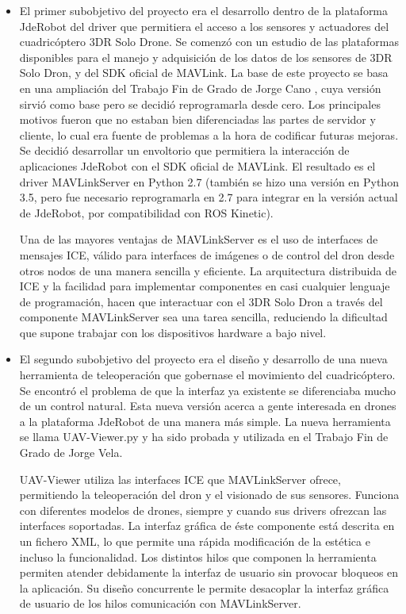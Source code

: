 \begin{itemize}
\item El primer subobjetivo del proyecto era el desarrollo dentro de la plataforma JdeRobot del driver que permitiera el acceso a los sensores y actuadores del cuadricóptero 3DR Solo Drone. Se comenzó con un estudio de las plataformas disponibles para el manejo y adquisición de los datos de los sensores de 3DR Solo Dron, y del SDK oficial de MAVLink. La base de este proyecto se basa en una ampliación del Trabajo Fin de Grado de Jorge Cano \cite{jorgeCano}, cuya versión sirvió como base pero se decidió reprogramarla desde cero. Los principales motivos fueron que no estaban bien diferenciadas las partes de servidor y cliente, lo cual era fuente de problemas a la hora de codificar futuras mejoras. Se decidió desarrollar un envoltorio que permitiera la interacción de aplicaciones JdeRobot con el SDK oficial de MAVLink. El resultado es el driver MAVLinkServer en Python 2.7 (también se hizo una versión en Python 3.5, pero fue necesario reprogramarla en 2.7 para integrar en la versión actual de JdeRobot, por compatibilidad con ROS Kinetic). 

Una de las mayores ventajas de MAVLinkServer es el uso de interfaces de mensajes ICE, válido para interfaces de imágenes o de control del dron desde otros nodos de una manera sencilla y eficiente. La arquitectura distribuida de ICE y la facilidad para implementar componentes en casi cualquier lenguaje de programación, hacen que interactuar con el 3DR Solo Dron a través del componente MAVLinkServer sea una tarea sencilla, reduciendo la dificultad que supone trabajar con los dispositivos hardware a bajo nivel.

\item El segundo subobjetivo del proyecto era el diseño y desarrollo de una nueva herramienta de teleoperación que gobernase el movimiento del cuadricóptero. Se encontró el problema de que la interfaz ya existente se diferenciaba mucho de un control natural. Esta nueva versión acerca a gente interesada en drones a la plataforma JdeRobot de una manera más simple. La nueva herramienta se llama UAV-Viewer.py y ha sido probada y utilizada en el Trabajo Fin de Grado de Jorge Vela\cite{jorgeVela}.

UAV-Viewer utiliza las interfaces ICE que MAVLinkServer ofrece, permitiendo la teleoperación del dron y el visionado de sus sensores. Funciona con diferentes modelos de drones, siempre y cuando sus drivers ofrezcan las interfaces soportadas. La interfaz gráfica de éste componente está descrita en un fichero XML, lo que permite una rápida modificación de la estética e incluso la funcionalidad. Los distintos hilos que componen la herramienta permiten atender debidamente la interfaz de usuario sin provocar bloqueos en la aplicación. Su diseño concurrente le permite desacoplar la interfaz gráfica de usuario de los hilos comunicación con MAVLinkServer.


\end{itemize}
